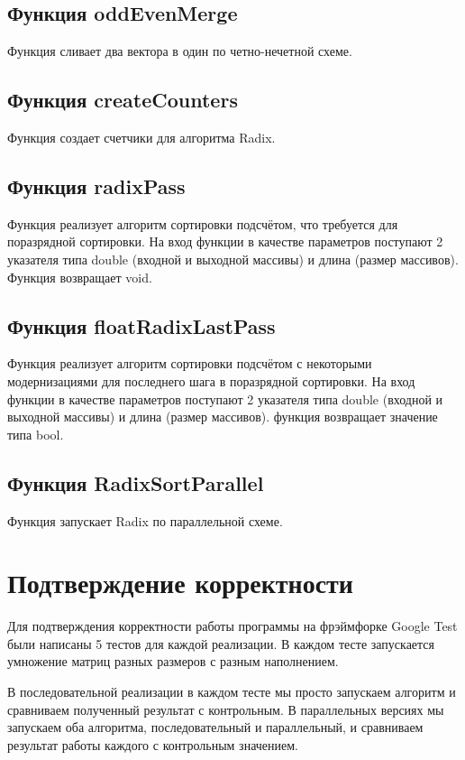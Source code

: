 \documentclass{report}
\begin{document}
\subsection*{Функция oddEvenMerge} 
\par Функция сливает два вектора в один по четно-нечетной схеме.

\subsection*{Функция createCounters} 
Функция создает счетчики для алгоритма Radix.

\subsection*{Функция radixPass} 
\par Функция реализует алгоритм сортировки подсчётом, что требуется для поразрядной сортировки. На вход функции в качестве параметров поступают 2 указателя типа double (входной и выходной массивы) и длина (размер массивов).
Функция возвращает void.

\subsection*{Функция floatRadixLastPass} 
\par Функция реализует алгоритм сортировки подсчётом с некоторыми модернизациями для последнего шага в поразрядной сортировки. На вход функции в качестве параметров поступают 2 указателя типа double (входной и выходной массивы) и длина (размер массивов). функция возвращает значение типа bool.

\subsection*{Функция RadixSortParallel} 
\par Функция запускает Radix по параллельной схеме.

\newpage

\section*{Подтверждение корректности}
\par Для подтверждения корректности работы программы на фрэймфорке Google Test были написаны 5 тестов для каждой реализации. В каждом тесте запускается умножение матриц разных размеров с разным наполнением.
\par В последовательной реализации в каждом тесте мы просто запускаем алгоритм и сравниваем полученный результат с контрольным. В параллельных версиях мы запускаем оба алгоритма, последовательный и параллельный, и сравниваем результат работы каждого с контрольным значением.
\newpage
\end{document}
